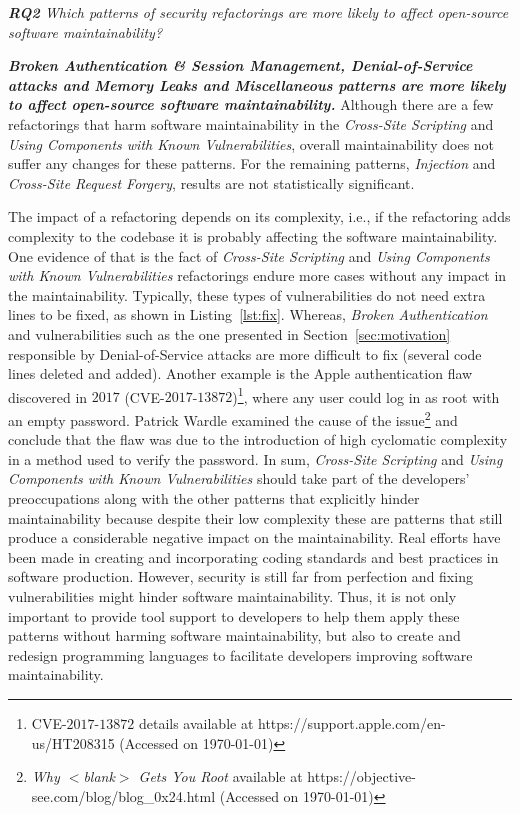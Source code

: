 \documentclass[10pt,conference]{IEEEtran}
\begin{document}
\begin{framed}
\textit{\textbf{RQ2} Which patterns of security refactorings are more likely to
affect open-source software maintainability?}
\end{framed}

\textbf{\textit{Broken Authentication \& Session Management, Denial-of-Service
attacks and Memory Leaks and Miscellaneous patterns are more likely to affect
open-source software maintainability.}} Although there are a few refactorings
that harm software maintainability in the \emph{Cross-Site Scripting} and
\emph{Using Components with Known Vulnerabilities}, overall maintainability does
not suffer any changes for these patterns. For the remaining patterns,
\emph{Injection} and \emph{Cross-Site Request Forgery}, results are not
statistically significant.

The impact of a refactoring depends on its complexity, i.e., if the refactoring
adds complexity to the codebase it is probably affecting the software
maintainability. One evidence of that is the fact of \emph{Cross-Site Scripting}
and \emph{Using Components with Known Vulnerabilities} refactorings endure more
cases without any impact in the maintainability. Typically, these types of
vulnerabilities do not need extra lines to be fixed, as shown in
Listing~\ref{lst:fix}. Whereas, \emph{Broken Authentication} and vulnerabilities
such as the one presented in Section~\ref{sec:motivation} responsible by Denial-of-Service
attacks are more difficult to fix (several code lines deleted and added).
Another example is the Apple authentication flaw discovered in $2017$
(CVE-$2017$-$13872$)\footnote{CVE-$2017$-$13872$ details available at
https://support.apple.com/en-us/HT208315 (Accessed on \today{})}, where any user
could log in as root with an empty password. Patrick Wardle examined the cause
of the issue\footnote{\emph{Why $<$blank$>$ Gets You Root} available at
https://objective-see.com/blog/blog\_0x24.html (Accessed on \today{})} and
conclude that the flaw was due to the introduction of high cyclomatic complexity
in a method used to verify the password. In sum, \emph{Cross-Site Scripting} and
\emph{Using Components with Known Vulnerabilities} should take part of the
developers' preoccupations along with the other patterns that explicitly hinder
maintainability because despite their low complexity these are patterns that
still produce a considerable negative impact on the maintainability. Real
efforts have been made in creating and incorporating coding standards and best
practices in software production. However, security is still far from perfection
and fixing vulnerabilities might hinder software maintainability. Thus, it is
not only important to provide tool support to developers to help them apply these
patterns without harming software maintainability, but also to create and redesign
programming languages to facilitate developers improving software maintainability.
\end{document}
